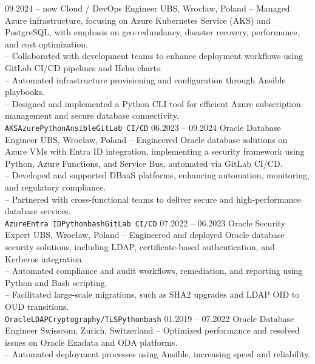 \documentclass[9pt]{developercv} %
\begin{document}
\begin{entrylist}

\entry
{09.2024 -- now}
{Cloud / DevOps Engineer}
{UBS, Wrocław, Poland}
{-- Managed Azure infrastructure, focusing on Azure Kubernetes Service (AKS) and PostgreSQL, with emphasis on geo-redundancy, disaster recovery, performance, and cost optimization.\\
-- Collaborated with development teams to enhance deployment workflows using GitLab CI/CD pipelines and Helm charts.\\
-- Automated infrastructure provisioning and configuration through Ansible playbooks.\\
-- Designed and implemented a Python CLI tool for efficient Azure subscription management and secure database connectivity.\\
\texttt{AKS}\slashsep\texttt{Azure}\slashsep\texttt{Python}\slashsep\texttt{Ansible}\slashsep\texttt{GitLab CI/CD}}
\entry
{06.2023 -- 09.2024}
{Oracle Database Engineer}
{UBS, Wrocław, Poland}
{-- Engineered Oracle database solutions on Azure VMs with Entra ID integration, implementing a security framework using Python, Azure Functions, and Service Bus, automated via GitLab CI/CD.\\
-- Developed and supported DBaaS platforms, enhancing automation, monitoring, and regulatory compliance.\\
-- Partnered with cross-functional teams to deliver secure and high-performance database services.\\
\texttt{Azure}\slashsep\texttt{Entra ID}\slashsep\texttt{Python}\slashsep\texttt{bash}\slashsep\texttt{GitLab CI/CD}}
\entry
{07.2022 -- 06.2023}
{Oracle Security Expert}
{UBS, Wrocław, Poland}
{-- Engineered and deployed Oracle database security solutions, including LDAP, certificate-based authentication, and Kerberos integration.\\
-- Automated compliance and audit workflows, remediation, and reporting using Python and Bash scripting.\\
-- Facilitated large-scale migrations, such as SHA2 upgrades and LDAP OID to OUD transitions.\\
\texttt{Oracle}\slashsep\texttt{LDAP}\slashsep\texttt{Cryptography/TLS}\slashsep\texttt{Python}\slashsep\texttt{bash}}
\entry
{01.2019 -- 07.2022}
{Oracle Database Engineer}
{Swisscom, Zurich, Switzerland}
{-- Optimized performance and resolved issues on Oracle Exadata and ODA platforms.\\
-- Automated deployment processes using Ansible, increasing speed and reliability.\\
}
\end{entrylist}
\end{document}
